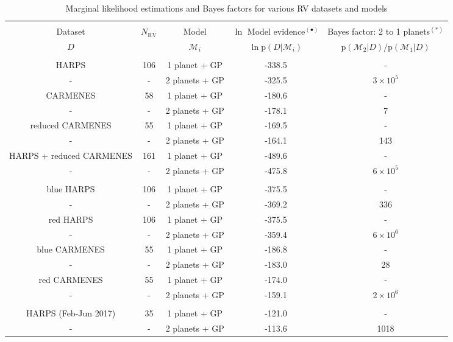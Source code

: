 \begin{table*}
\small
\renewcommand{\arraystretch}{0.7}
\centering
\caption[]{Marginal likelihood estimations and Bayes factors for various RV datasets and models}
\label{k2182table:perrakis}
\begin{tabular}{ccccc}
\hline \\ [-1ex]
Dataset & $N_{\text{RV}}$ & Model & $\ln$ Model evidence$^{(\bullet)}$ & Bayes factor: 2 to 1 planets$^{(\ast)}$ \\
$D$ & & $\mathcal{M}_i$ & $\ln{\text{p}(D|\mathcal{M}_i)}$ & $\text{p}(\mathcal{M}_2|D)/ \text{p}(\mathcal{M}_1|D)$ \smallskip \\
\hline \\ [-1ex]
HARPS & 106 & 1 planet + GP & -338.5 & - \\
- & - & 2 planets + GP & -325.5 & $3\times 10^5$ \\
CARMENES & 58 & 1 planet + GP & -180.6 & - \\
- & - & 2 planets + GP & -178.1 & 7 \\
reduced CARMENES & 55 & 1 planet + GP & -169.5 & - \\
- & - & 2 planets + GP & -164.1 & 143 \\
HARPS + reduced CARMENES & 161 & 1 planet + GP & -489.6 & - \\
- & - & 2 planets + GP & -475.8 & $6\times 10^5$ \\
\hline \\ [-1ex]
blue HARPS & 106 & 1 planet + GP & -375.5 & - \\
- & - & 2 planets + GP & -369.2 & 336 \\
red HARPS & 106 & 1 planet + GP & -375.5 & - \\
- & - & 2 planets + GP & -359.4 & $6\times 10^6$ \\
blue CARMENES & 55 & 1 planet + GP & -186.8 & - \\
- & - & 2 planets + GP & -183.0 & 28 \\
red CARMENES & 55 & 1 planet + GP & -174.0 & - \\
- & - & 2 planets + GP & -159.1 & $2\times 10^6$ \\
\hline \\ [-1ex]
HARPS (Feb-Jun 2017) & 35 & 1 planet + GP & -121.0 & - \\
- & - & 2 planets + GP & -113.6 & 1018 \\

\end{tabular}
\end{table*}
